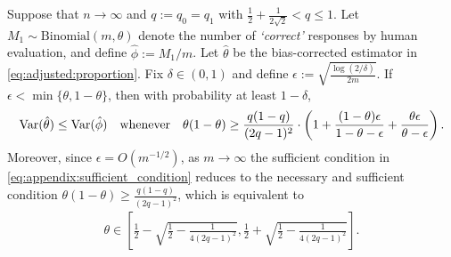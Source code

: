 \begin{proposition}
    Suppose that $n \to \infty$ and $q := q_0 = q_1$ with $\frac{1}{2} + \frac{1}{2\sqrt{2}} < q \leq 1$.
    Let $M_1 \sim \mathrm{Binomial}(m, \theta)$ denote the number of \emph{`correct'} responses by human evaluation, and define $\hat{\phi} := M_1 / m$.
    Let $\hat{\theta}$ be the bias-corrected estimator in \eqref{eq:adjusted:proportion}.
    Fix $\delta\in(0,1)$ and define $\epsilon := \sqrt{\tfrac{\log(2/\delta)}{2m}}$.
    If $\epsilon < \min\{\theta,1-\theta\}$, then with probability at least $1-\delta$,
    \begin{align}
        \displaystyle \mathrm{Var}(\hat{\theta})
        \le
        \displaystyle \mathrm{Var}(\hat{\phi})
        \quad\text{whenever}\quad
        \theta(1-\theta)
        \ge
        \frac{q(1-q)}{(2q-1)^2}\cdot
        \left(
            1
            +
            \frac{(1-\theta)\epsilon}{1-\theta-\epsilon}
            +
            \frac{\theta\epsilon}{\theta-\epsilon}
        \right).
        \label{eq:appendix:sufficient_condition}
    \end{align}
    Moreover, since $\epsilon = O(m^{-1/2})$, as $m\to\infty$ the sufficient condition in \eqref{eq:appendix:sufficient_condition} reduces to the necessary and sufficient condition $\theta(1-\theta)\ge \frac{q(1-q)}{(2q-1)^2}$, which is equivalent to
    \begin{align}
        \theta \in
        \left[
            \frac{1}{2}-\sqrt{\frac{1}{2}-\frac{1}{4(2q-1)^2}},
            \frac{1}{2}+\sqrt{\frac{1}{2}-\frac{1}{4(2q-1)^2}}
        \right].
    \end{align}
\end{proposition}
